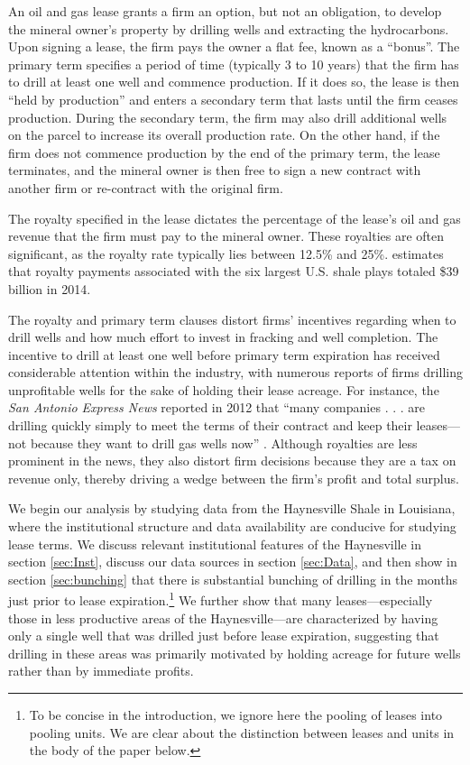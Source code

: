\documentclass[12pt]{article}
\begin{document}
An oil and gas lease grants a firm an option, but not an obligation, to develop the mineral owner's property by drilling wells and extracting the hydrocarbons. Upon signing a lease, the firm pays the owner a flat fee, known as a ``bonus''. The primary term specifies a period of time (typically 3 to 10 years) that the firm has to drill at least one well and commence production. If it does so, the lease is then ``held by production'' and enters a secondary term that lasts until the firm ceases production. During the secondary term, the firm may also drill additional wells on the parcel to increase its overall production rate. On the other hand, if the firm does not commence production by the end of the primary term, the lease terminates, and the mineral owner is then free to sign a new contract with another firm or re-contract with the original firm. 

The royalty specified in the lease dictates the percentage of the lease's oil and gas revenue that the firm must pay to the mineral owner. These royalties are often significant, as the royalty rate typically lies between 12.5\% and 25\%. \citet{bib:brown} estimates that royalty payments associated with the six largest U.S. shale plays totaled \$39 billion in 2014.

The royalty and primary term clauses distort firms' incentives regarding when to drill wells and how much effort to invest in fracking and well completion. The incentive to drill at least one well before primary term expiration has received considerable attention within the industry, with numerous reports of firms drilling unprofitable wells for the sake of holding their lease acreage. For instance, the {\it San Antonio Express News} reported in 2012 that ``many companies . . . are drilling quickly simply to meet the terms of their contract and keep their leases---not because they want to drill gas wells now'' \citep{bib:hiller}. Although royalties are less prominent in the news, they also distort firm decisions because they are a tax on revenue only, thereby driving a wedge between the firm's profit and total surplus.

We begin our analysis by studying data from the Haynesville Shale in Louisiana, where the institutional structure and data availability are conducive for studying lease terms. We discuss relevant institutional features of the Haynesville in section \ref{sec:Inst}, discuss our data sources in section \ref{sec:Data}, and then show in section \ref{sec:bunching} that there is substantial bunching of drilling in the months just prior to lease expiration.\footnote{To be concise in the introduction, we ignore here the pooling of leases into pooling units. We are clear about the distinction between leases and units in the body of the paper below.} We further show that many leases---especially those in less productive areas of the Haynesville---are characterized by having only a single well that was drilled just before lease expiration, suggesting that drilling in these areas was primarily motivated by holding acreage for future wells rather than by immediate profits.
\end{document}
